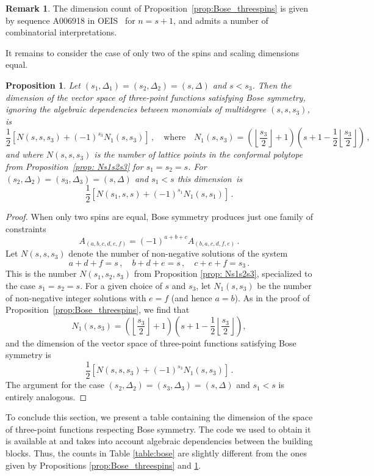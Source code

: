 \documentclass[12pt,a4paper]{extarticle}
\newtheorem{proposition}[theorem]{Proposition}
\theoremstyle{definition}
\newtheorem{remark}[theorem]{Remark}
\begin{document}
\begin{remark}
    The dimension count of Proposition~\ref{prop:Bose_threespins} is given by sequence A006918 in OEIS~\cite{oeis} for $n=s+1$, and admits a number of combinatorial interpretations.
\end{remark}

It remains to consider the case of only two of the spins and scaling dimensions equal.
\begin{proposition}\label{prop:Bose-two-spins}
    Let $(s_1,\Delta_1)=(s_2,\Delta_2)=(s,\Delta)$ and $s<s_3$. Then the dimension of the vector space of three-point functions satisfying Bose symmetry, ignoring the algebraic dependencies between monomials of multidegree $(s,s,s_3)$, is
     $$\frac{1}{2}[N(s,s,s_3)+(-1)^{s_3}N_1(s,s_3)]\,,\quad\mathrm{where}\quad N_1(s,s_3)=\left(\left\lfloor\dfrac{s_3}{2}   \right\rfloor+1\right)\left(s+1-\frac{1}{2}\left\lfloor\dfrac{s_3}{2}\right\rfloor\right)\,,$$
      and where $N(s,s,s_3)$ is the number of lattice points in the conformal polytope from Proposition~\ref{prop: Ns1s2s3} for $s_1=s_2=s$.
     For $(s_2,\Delta_2)=(s_3,\Delta_3)=(s,\Delta)$ and $s_1<s$ this dimension~is
      $$\frac{1}{2}[N(s_1,s,s)+(-1)^{s_1}N_1(s,s_1)]\,.$$
\end{proposition}
\begin{proof}
     When only two spins are equal, Bose symmetry produces just one family of constraints
    $$A_{(a,b,c,d,e,f)}=(-1)^{a+b+c}A_{(b,a,c,d,f,e)}\,.$$
    Let $N(s,s,s_3)$ denote the number of non-negative solutions of the system 
    $$a+d+f=s\,,\quad b+d+e=s\,,\quad c+e+f=s_3\,.$$
    This is the number $N(s_1,s_2,s_3)$ from Proposition \ref{prop: Ns1s2s3}, specialized to the case $s_1=s_2=s$. For a given choice of $s$ and $s_3$, let $N_1(s,s_3)$ be the number of non-negative integer solutions with $e=f$ (and hence $a=b$). As in the proof of Proposition~\ref{prop:Bose_threespins}, we find that
    $$N_1(s,s_3)=\left(\left\lfloor\dfrac{s_3}{2}\right\rfloor+1\right)\left( s+1-\frac{1}{2}\left\lfloor\frac{s_3}{2}\right\rfloor\right),$$
    and the dimension of the vector space of three-point functions satisfying Bose symmetry is
    $$\frac{1}{2}[N(s,s,s_3)+(-1)^{s_3}N_1(s,s_3)]\,.$$
    The argument for the case $(s_2,\Delta_2)=(s_3,\Delta_3)=(s,\Delta)$ and $s_1<s$ is entirely analogous. 
\end{proof}

To conclude this section, we present a table containing the dimension of the space of three-point functions respecting Bose symmetry. The code we used to obtain it is available at \cite{zenodo} and takes into account algebraic dependencies between the building blocks. Thus, the counts in Table \ref{table:bose} are slightly different from the ones given by Propositions \ref{prop:Bose_threespins} and \ref{prop:Bose-two-spins}. 
\end{document}
